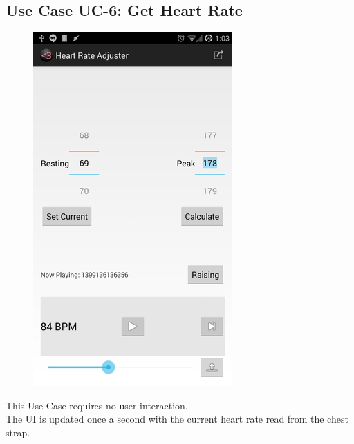\documentclass[letterpaper,english, 12pt]{scrreprt}
\begin{document}
\subsection{Use Case UC-6: Get Heart Rate}
\begin{figure}[H]
	\centering
	\includegraphics{img/Prelim_Design/1.png}\\
\end{figure}

This Use Case requires no user interaction.\\
The UI is updated once a second with the current heart rate read from the chest strap.
\end{document}

